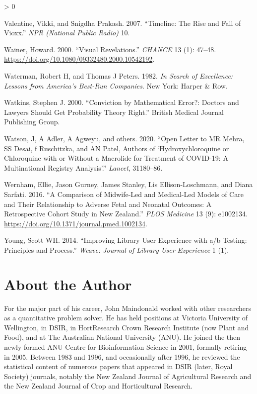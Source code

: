 \documentclass[
  10pt,
  b5paper]{book}
\newlength{\cslhangindent}
\newenvironment{CSLReferences}[2] %
 {%
  \setlength{\parindent}{0pt}
  \ifodd #1 \everypar{\setlength{\hangindent}{\cslhangindent}}\ignorespaces\fi
  \ifnum #2 > 0
  \setlength{\parskip}{#2\baselineskip}
  \fi
 }%
 {}
\begin{document}
\begin{CSLReferences}{1}{0}
\leavevmode\hypertarget{ref-valentine2007timeline}{}%
Valentine, Vikki, and Snigdha Prakash. 2007. {``Timeline: The Rise and Fall of Vioxx.''} \emph{NPR (National Public Radio)} 10.

\leavevmode\hypertarget{ref-wainerRegress}{}%
Wainer, Howard. 2000. {``Visual Revelations.''} \emph{CHANCE} 13 (1): 47--48. \url{https://doi.org/10.1080/09332480.2000.10542192}.

\leavevmode\hypertarget{ref-waterman1982search}{}%
Waterman, Robert H, and Thomas J Peters. 1982. \emph{In Search of Excellence: Lessons from America's Best-Run Companies}. New York: Harper \& Row.

\leavevmode\hypertarget{ref-watkins2000conviction}{}%
Watkins, Stephen J. 2000. {``Conviction by Mathematical Error?: Doctors and Lawyers Should Get Probability Theory Right.''} British Medical Journal Publishing Group.

\leavevmode\hypertarget{ref-watson2020open}{}%
Watson, J, A Adler, A Agweyu, and others. 2020. {``Open Letter to MR Mehra, SS Desai, f Ruschitzka, and AN Patel, Authors of {`Hydroxychloroquine or Chloroquine with or Without a Macrolide for Treatment of COVID-19: A Multinational Registry Analysis'}.''} \emph{Lancet}, 31180--86.

\leavevmode\hypertarget{ref-wernham_EtAl_2016}{}%
Wernham, Ellie, Jason Gurney, James Stanley, Lis Ellison-Loschmann, and Diana Sarfati. 2016. {``A Comparison of Midwife-Led and Medical-Led Models of Care and Their Relationship to Adverse Fetal and Neonatal Outcomes: A Retrospective Cohort Study in New Zealand.''} \emph{PLOS Medicine} 13 (9): e1002134. \url{https://doi.org/10.1371/journal.pmed.1002134}.

\leavevmode\hypertarget{ref-young2014improving}{}%
Young, Scott WH. 2014. {``Improving Library User Experience with a/b Testing: Principles and Process.''} \emph{Weave: Journal of Library User Experience} 1 (1).

\end{CSLReferences}

\hypertarget{about-the-author}{%
\chapter*{About the Author}\label{about-the-author}}

For the major part of his career, John Maindonald worked with other
researchers as a quantitative problem solver.
He has held positions at Victoria University of Wellington, in DSIR, in HortResearch Crown Research Institute (now Plant and Food), and at The Australian National University (ANU). He joined the then newly formed ANU Centre for Bioinformation Science in 2001, formally retiring in 2005.
Between 1983 and 1996, and occasionally after 1996, he reviewed the statistical content of numerous papers that appeared in DSIR (later, Royal Society) journals, notably the New Zealand Journal of Agricultural Research and the New Zealand Journal of Crop and Horticultural Research.
\end{document}
